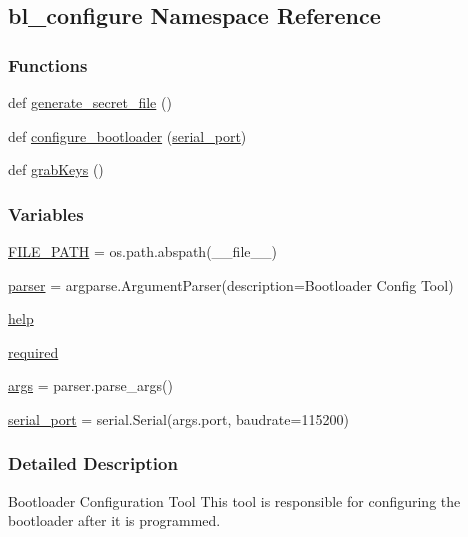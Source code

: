 \hypertarget{namespacebl__configure}{}\subsection{bl\+\_\+configure Namespace Reference}
\label{namespacebl__configure}
\subsubsection*{Functions}
\begin{DoxyCompactItemize}
\item 
def \hyperlink{namespacebl__configure_aa03bcc90dd45cdf168040dd97474dd3f}{generate\+\_\+secret\+\_\+file} ()
\item 
def \hyperlink{namespacebl__configure_a13b2e4d272f346de76550bfeb68e58fd}{configure\+\_\+bootloader} (\hyperlink{namespacebl__configure_adc4c564751a3c74ac9094765124167b0}{serial\+\_\+port})
\item 
def \hyperlink{namespacebl__configure_a36908b22c0bc31acc390af22d287e739}{grab\+Keys} ()
\end{DoxyCompactItemize}
\subsubsection*{Variables}
\begin{DoxyCompactItemize}
\item 
\hyperlink{namespacebl__configure_abf89a1872f581e45d6826c5295a1a1e7}{F\+I\+L\+E\+\_\+\+P\+A\+TH} = os.\+path.\+abspath(\+\_\+\+\_\+file\+\_\+\+\_\+)
\item 
\hyperlink{namespacebl__configure_a90eee7a4677ca8b1ed116364a24367f9}{parser} = argparse.\+Argument\+Parser(description=\textquotesingle{}Bootloader Config Tool\textquotesingle{})
\item 
\hyperlink{namespacebl__configure_a81ae9faedaa69e3e28e2960a0548df8d}{help}
\item 
\hyperlink{namespacebl__configure_ae81948490ddf54e80a22593640178350}{required}
\item 
\hyperlink{namespacebl__configure_a8187411843a6284ffb964ef3fb9fcab3}{args} = parser.\+parse\+\_\+args()
\item 
\hyperlink{namespacebl__configure_adc4c564751a3c74ac9094765124167b0}{serial\+\_\+port} = serial.\+Serial(args.\+port, baudrate=115200)
\end{DoxyCompactItemize}


\subsubsection{Detailed Description}
\begin{DoxyVerb}Bootloader Configuration Tool
This tool is responsible for configuring the bootloader after it is programmed.
\end{DoxyVerb}
 


